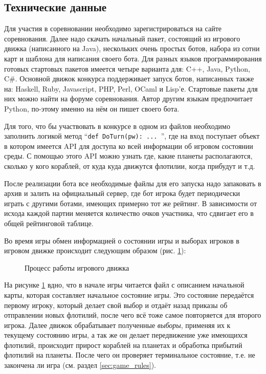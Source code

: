 \documentclass[12pt]{report}
\begin{document}
\subsection{Технические данные}
Для участия в соревновании необходимо зарегистрироваться на сайте соревнования. Далее надо скачать начальный пакет, состоящий из игрового движка (написанного на Java), нескольких очень простых ботов, набора из сотни карт и шаблона для написания своего бота. Для разных языков программирования готовых стартовых пакетов имеется четыре варианта для: C++, Java, Python, C\#. Основной движок конкурса поддерживает запуск ботов, написанных также на: Haskell, Ruby, Javascript, PHP, Perl, OCaml и Lisp'е. Стартовые пакеты для них можно найти на форуме соревнования. Автор другим языкам предпочитает Python, по-этому именно на нём он пишет своего бота.

Для того, что бы участвовать в конкурсе в одном из файлов необходимо заполнить логикой метод ``\texttt{def DoTurn(pw): ... }'', где на вход поступает объект в котором имеется API для доступа ко всей информации об игровом состоянии среды. С помощью этого API можно узнать где, какие планеты располагаются, сколько у кого кораблей, от куда куда движутся флотилии, когда прибудут и т.д. 

После реализации бота все необходимые файлы для его запуска надо запаковать в архив и залить на официальный сервер, где бот игрока будет периодически играть с другими ботами, имеющих примерно тот же рейтинг. В зависимости от исхода каждой партии меняется количество очков участника, что сдвигает его в общей рейтинговой таблице.

Во время игры обмен информацией о состоянии игры и выборах игроков в игровом движке происходит следующим образом (рис. \ref{fig:pw_engine_process}):

\begin{figure}[h]
	\centering
	
	\caption{Процесс работы игрового движка}
	\label{fig:pw_engine_process}
\end{figure}
На рисунке \ref{fig:pw_engine_process} вдно, что в начале игры читается файл с описанием начальной карты, которая составляет начальное состояние игры. Это состояние передаётся первому игроку, который делает свой выбор и отдаёт назад приказы об отправлении новых флотилий, после чего всё тоже самое повторяется для второго игрока. Далее движок обрабатывает полученные \emph{выборы}, применяя их к текущему состоянию игры, а так же он делает передвижение уже имеющихся флотилий, происходит прирост кораблей на планетах и обработка прибытий флотилий на планеты. После чего он проверяет терминальное состояние, т.е. не закончена ли игра (см. раздел \ref{sec:game_rules}).
\end{document}
